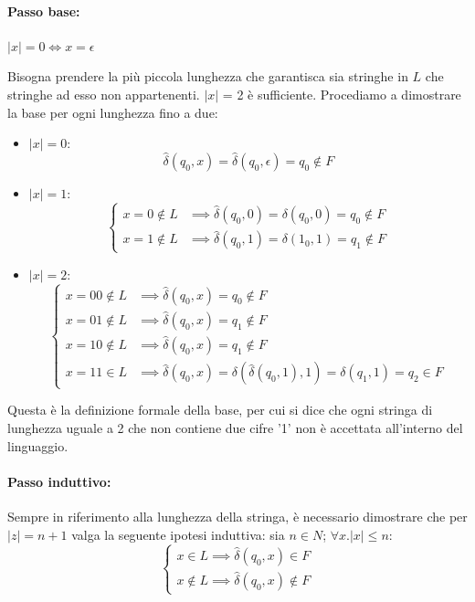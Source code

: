 \paragraph{Passo base:} $|x| = 0 \iff x = \epsilon$\par
Bisogna prendere la più piccola lunghezza che garantisca sia stringhe in $L$ che stringhe ad esso non appartenenti. $|x|$ = 2 è sufficiente. Procediamo
a dimostrare la base per ogni lunghezza fino a due: \begin{itemize}
    \item $|x| = 0$: \[
        \hat{\delta}(q_0, x) = \hat{\delta}(q_0, \epsilon) = q_0\notin F
    \]
    \item $|x| = 1$: \[ \begin{cases}
        x = 0\notin L &\implies \hat{\delta}(q_0, 0) = \delta(q_0, 0) = q_0\notin F\\
        x = 1\notin L &\implies \hat{\delta}(q_0, 1) = \delta(1_0, 1) = q_1\notin F
    \end{cases} \]
    \item $|x| = 2$: \[ \begin{cases}
        x = 00\notin L &\implies \hat{\delta}(q_0, x) = q_0\notin F\\
        x = 01\notin L &\implies \hat{\delta}(q_0, x) = q_1\notin F\\
        x = 10\notin L &\implies \hat{\delta}(q_0, x) = q_1\notin F\\
        x = 11\in L &\implies \hat{\delta}(q_0, x) = \delta(\hat{\delta}(q_0, 1), 1) = \delta(q_1, 1) = q_2\in F
    \end{cases} \]
\end{itemize}

\noindent Questa è la definizione formale della base, per cui si dice che ogni stringa di lunghezza uguale a 2 che non contiene due cifre '1' non è
accettata all'interno del linguaggio.

\paragraph{Passo induttivo:} Sempre in riferimento alla lunghezza della stringa, è necessario dimostrare che per $|z| = n+1$ valga la seguente ipotesi
induttiva: sia $n\in N$; $\forall x.|x|\leq n$: \[ \begin{cases}
    x\in L \implies \hat{\delta}(q_0, x)\in F\\
    x\notin L \implies \hat{\delta}(q_0, x)\notin F
\end{cases} \]

